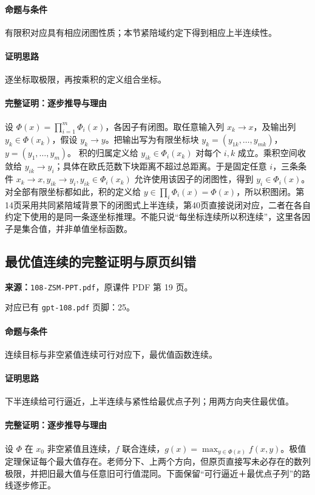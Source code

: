 \paragraph{命题与条件}有限积对应具有相应闭图性质；本节紧陪域约定下得到相应上半连续性。
\paragraph{证明思路}逐坐标取极限，再按乘积的定义组合坐标。
\paragraph{完整证明：逐步推导与理由}

设 $\Phi(x)=\prod_{i=1}^m\Phi_i(x)$，各因子有闭图。取任意输入列 $x_k\to x$，及输出列 $y_k\in\Phi(x_k)$，假设 $y_k\to y$。把输出写为有限坐标块 $y_k=(y_{1k},\ldots,y_{mk})$，$y=(y_1,\ldots,y_m)$。
积的归属定义给 $y_{ik}\in\Phi_i(x_k)$ 对每个 $i,k$ 成立。乘积空间收敛给 $y_{ik}\to y_i$；具体在欧氏范数下块距离不超过总距离。于是固定任意 $i$，三条条件 $x_k\to x,y_{ik}\to y_i,y_{ik}\in\Phi_i(x_k)$ 允许使用该因子的闭图性，得到 $y_i\in\Phi_i(x)$。
对全部有限坐标都如此，积的定义给 $y\in\prod_i\Phi_i(x)=\Phi(x)$，所以积图闭。第14页采用共同紧陪域背景下的闭图式上半连续，第40页直接说闭对应，二者在各自约定下使用的是同一条逐坐标推理。不能只说“每坐标连续所以积连续”，这里各因子是集合值，并非单值坐标函数。

\clearpage\subsection{最优值连续的完整证明与原页纠错}
\textbf{来源：}\texttt{108-ZSM-PPT.pdf}，原课件 PDF 第 19 页。\par
对应已有 \texttt{gpt-108.pdf} 页脚：25。\par
\paragraph{命题与条件}连续目标与非空紧值连续可行对应下，最优值函数连续。
\paragraph{证明思路}下半连续给可行逼近，上半连续与紧性给最优点子列；用两方向夹住最优值。
\paragraph{完整证明：逐步推导与理由}

设 $\Phi$ 在 $x_0$ 非空紧值且连续，$f$ 联合连续，$g(x)=\max_{y\in\Phi(x)}f(x,y)$。极值定理保证每个最大值存在。老师分下、上两个方向，但原页直接写未必存在的数列极限，并把旧最大值与任意旧可行值混同。下面保留“可行逼近＋最优点子列”的路线逐步修正。
